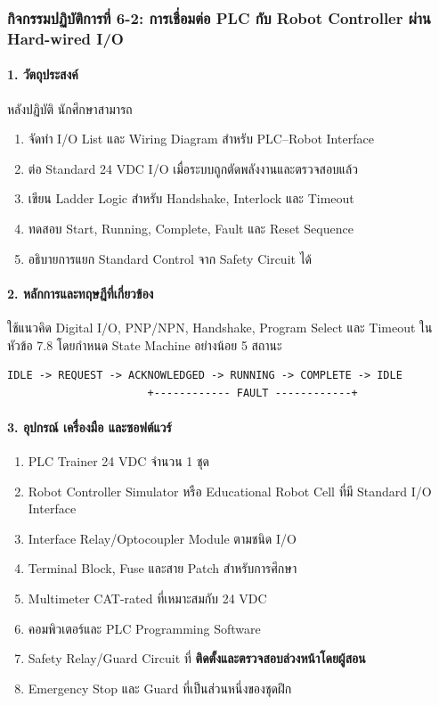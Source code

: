 \subsubsection{กิจกรรมปฏิบัติการที่ 6-2: การเชื่อมต่อ PLC กับ Robot Controller ผ่าน Hard-wired I/O}

\paragraph{1. วัตถุประสงค์}

หลังปฏิบัติ นักศึกษาสามารถ

\begin{enumerate}
    \item จัดทำ I/O List และ Wiring Diagram สำหรับ PLC–Robot Interface
    \item ต่อ Standard 24 VDC I/O เมื่อระบบถูกตัดพลังงานและตรวจสอบแล้ว
    \item เขียน Ladder Logic สำหรับ Handshake, Interlock และ Timeout
    \item ทดสอบ Start, Running, Complete, Fault และ Reset Sequence
    \item อธิบายการแยก Standard Control จาก Safety Circuit ได้
\end{enumerate}

\paragraph{2. หลักการและทฤษฎีที่เกี่ยวข้อง}

ใช้แนวคิด Digital I/O, PNP/NPN, Handshake, Program Select และ Timeout ในหัวข้อ 7.8 โดยกำหนด State Machine อย่างน้อย 5 สถานะ

\begin{verbatim}
IDLE -> REQUEST -> ACKNOWLEDGED -> RUNNING -> COMPLETE -> IDLE
                      +------------ FAULT ------------+
\end{verbatim}

\paragraph{3. อุปกรณ์ เครื่องมือ และซอฟต์แวร์}

\begin{enumerate}
    \item PLC Trainer 24 VDC จำนวน 1 ชุด
    \item Robot Controller Simulator หรือ Educational Robot Cell ที่มี Standard I/O Interface
    \item Interface Relay/Optocoupler Module ตามชนิด I/O
    \item Terminal Block, Fuse และสาย Patch สำหรับการศึกษา
    \item Multimeter CAT-rated ที่เหมาะสมกับ 24 VDC
    \item คอมพิวเตอร์และ PLC Programming Software
    \item Safety Relay/Guard Circuit ที่ \textbf{ติดตั้งและตรวจสอบล่วงหน้าโดยผู้สอน}
    \item Emergency Stop และ Guard ที่เป็นส่วนหนึ่งของชุดฝึก
\end{enumerate}

